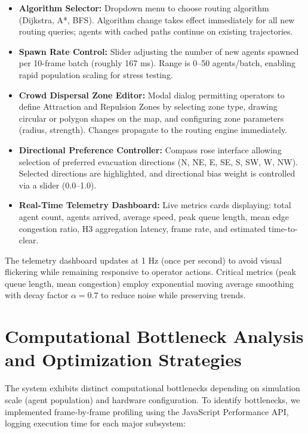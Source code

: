 \documentclass[12pt,a4paper,oneside]{report}
\begin{document}
\begin{itemize}
    \item \textbf{Algorithm Selector:} Dropdown menu to choose routing algorithm (Dijkstra, A*, BFS). Algorithm change takes effect immediately for all new routing queries; agents with cached paths continue on existing trajectories.
    
    \item \textbf{Spawn Rate Control:} Slider adjusting the number of new agents spawned per 10-frame batch (roughly 167 ms). Range is 0--50 agents/batch, enabling rapid population scaling for stress testing.
    
    \item \textbf{Crowd Dispersal Zone Editor:} Modal dialog permitting operators to define Attraction and Repulsion Zones by selecting zone type, drawing circular or polygon shapes on the map, and configuring zone parameters (radius, strength). Changes propagate to the routing engine immediately.
    
    \item \textbf{Directional Preference Controller:} Compass rose interface allowing selection of preferred evacuation directions (N, NE, E, SE, S, SW, W, NW). Selected directions are highlighted, and directional bias weight is controlled via a slider (0.0--1.0).
    
    \item \textbf{Real-Time Telemetry Dashboard:} Live metrics cards displaying: total agent count, agents arrived, average speed, peak queue length, mean edge congestion ratio, H3 aggregation latency, frame rate, and estimated time-to-clear.
\end{itemize}

The telemetry dashboard updates at 1 Hz (once per second) to avoid visual flickering while remaining responsive to operator actions. Critical metrics (peak queue length, mean congestion) employ exponential moving average smoothing with decay factor $\alpha = 0.7$ to reduce noise while preserving trends.

\section{Computational Bottleneck Analysis and Optimization Strategies}
The system exhibits distinct computational bottlenecks depending on simulation scale (agent population) and hardware configuration. To identify bottlenecks, we implemented frame-by-frame profiling using the JavaScript Performance API, logging execution time for each major subsystem:
\end{document}
